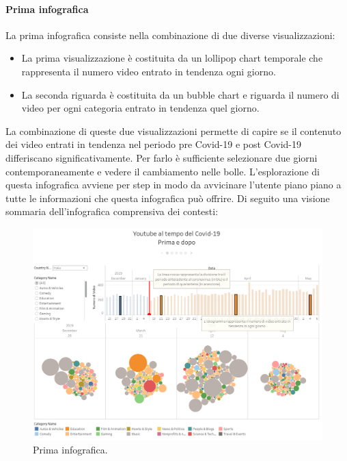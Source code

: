 \documentclass[10pt, a4paper,openany]{article}
\begin{document}
\paragraph{Prima infografica} La prima infografica consiste nella combinazione di due diverse visualizzazioni:
\begin{itemize}
	\item La prima visualizzazione è costituita da un lollipop chart temporale che rappresenta il numero video entrato in tendenza ogni giorno.
	\item La seconda riguarda è costituita da un bubble chart e riguarda il numero di video per ogni categoria entrato in tendenza quel giorno.
\end{itemize}
La combinazione di queste due visualizzazioni permette di capire se il contenuto dei video entrati in tendenza nel periodo pre Covid-19 e post Covid-19 differiscano significativamente. Per farlo è sufficiente selezionare due giorni contemporaneamente e vedere il cambiamento nelle bolle. L'esplorazione di questa infografica avviene per step in modo da avvicinare l'utente piano piano a tutte le informazioni che questa infografica può offrire. Di seguito una visione sommaria dell'infografica comprensiva dei contesti:
\begin{figure}[H]
	\centering
	\includegraphics[height=0.5 \linewidth]{pics/prima_infografica.png}
	\caption{Prima infografica.}
\end{figure}
\end{document}
